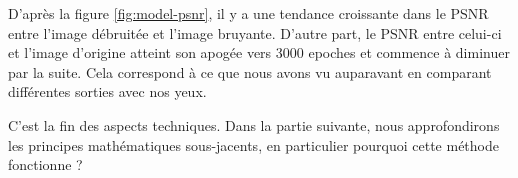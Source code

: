 \documentclass[
  11pt,
  dvipsnames]{article}
\begin{document}
D'après la figure \ref{fig:model-psnr}, il y a une tendance croissante dans le PSNR entre l'image débruitée et l'image bruyante. D'autre part, le PSNR entre celui-ci et l'image d'origine atteint son apogée vers 3000 epoches et commence à diminuer par la suite. Cela correspond à ce que nous avons vu auparavant en comparant différentes sorties avec nos yeux.

C'est la fin des aspects techniques. Dans la partie suivante, nous approfondirons les principes mathématiques sous-jacents, en particulier pourquoi cette méthode fonctionne ?

\newpage

\printbibliography
\end{document}
